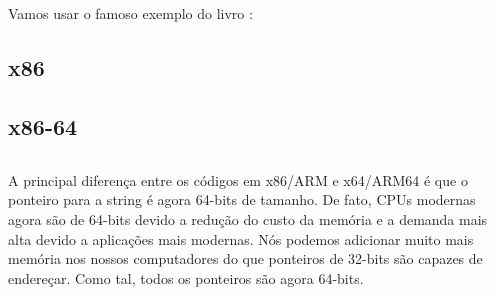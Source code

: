 \chapter{\HelloWorldSectionName}
\label{sec:helloworld}

Vamos usar o famoso exemplo do livro \KRBook:



\section{x86}




\section{x86-64}







\section{\Conclusion{}}

A principal diferença entre os códigos em x86/ARM e x64/ARM64 é que o ponteiro para a string é agora 64-bits de tamanho.
De fato, \ac{CPU}s modernas agora são de 64-bits devido a redução do custo da memória e a demanda mais alta devido a aplicações mais modernas.
Nós podemos adicionar muito mais memória nos nossos computadores do que ponteiros de 32-bits são capazes de endereçar.
Como tal, todos os ponteiros são agora 64-bits.



